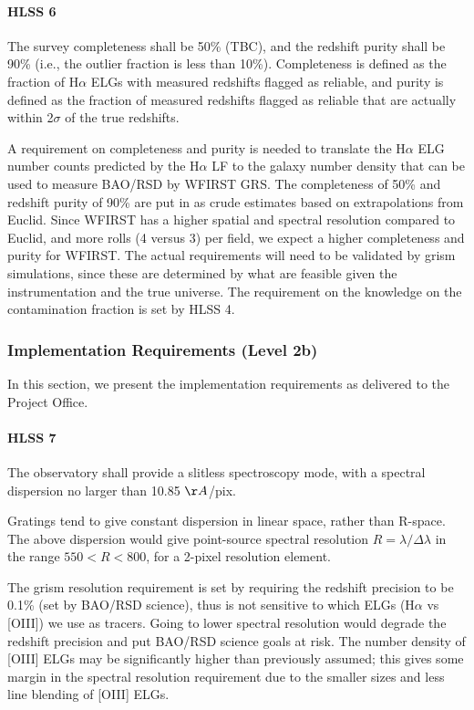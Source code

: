 \paragraph{HLSS 6} The survey completeness shall be 50\% (TBC), and the redshift purity
 shall be 90\% (i.e., the outlier fraction is less than 10\%). Completeness is
 defined as the fraction of H$\alpha$ ELGs with measured redshifts flagged as reliable, and purity is defined as the fraction of measured redshifts flagged as reliable that are actually within 2$\sigma$ of the true redshifts.

 A requirement on completeness and purity is needed to translate the H$\alpha$ ELG
 number counts predicted by the H$\alpha$ LF to the galaxy number density that can be used to measure BAO/RSD by WFIRST GRS.  The completeness of 50\% and redshift
 purity of 90\% are put in as crude estimates based on extrapolations from
 Euclid.  Since WFIRST has a higher spatial and spectral resolution compared to
 Euclid, and more rolls (4 versus 3) per field, we expect a higher completeness
 and purity for WFIRST.  The actual requirements will need to be validated by
 grism simulations, since these are determined by what are feasible given the
 instrumentation and the true universe.  The requirement on the knowledge on the
 contamination fraction is set by HLSS 4.


 \subsubsection{Implementation Requirements (Level 2b)} In this section, we present the implementation requirements as delivered to the Project Office.

\paragraph{HLSS 7} The observatory shall provide a slitless spectroscopy mode, with a spectral dispersion no larger than 10.85 $\AA$/pix.

 Gratings tend to give constant dispersion in linear space, rather than R-space.
 The above dispersion would give point-source spectral resolution
 $R=\lambda/\Delta\lambda$ in the
 range $550 <R < 800$, for a 2-pixel resolution element.

 The grism resolution requirement is set by requiring the redshift precision to
 be 0.1\% (set by BAO/RSD science), thus is not sensitive to which ELGs (H$\alpha$
 vs [OIII]) we use as tracers. Going to lower spectral resolution would degrade
 the redshift precision and put BAO/RSD science goals at risk. The number density
 of [OIII] ELGs may be significantly higher than previously assumed; this gives
 some margin in the spectral resolution requirement due to the smaller sizes and
 less line blending of [OIII] ELGs.

